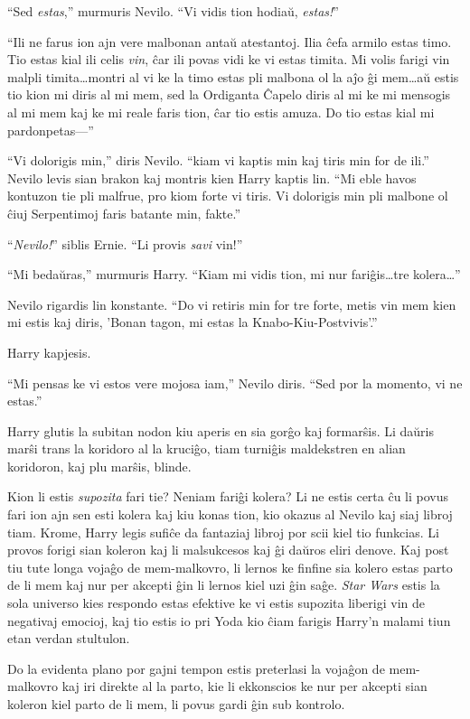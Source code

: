 ``Sed \emph{estas},'' murmuris Nevilo. ``Vi vidis tion hodiaŭ, \emph{estas!}''

``Ili ne farus ion ajn vere malbonan antaŭ atestantoj. Ilia ĉefa armilo estas
timo. Tio estas kial ili celis \emph{vin}, ĉar ili povas vidi ke vi estas
timita. Mi volis farigi vin malpli timita\ldots montri al vi ke la timo estas
pli malbona ol la aĵo ĝi mem\ldots aŭ estis tio kion mi diris al mi mem, sed la
Ordiganta Ĉapelo diris al mi ke mi mensogis al mi mem kaj ke mi reale faris
tion, ĉar tio estis amuza. Do tio estas kial mi pardonpetas—''

``Vi dolorigis min,'' diris Nevilo. ``kiam vi kaptis min kaj
tiris min for de ili.'' Nevilo levis sian brakon kaj montris kien
Harry kaptis lin. ``Mi eble havos kontuzon tie pli malfrue, pro kiom
forte vi tiris. Vi dolorigis min pli malbone ol ĉiuj Serpentimoj
faris batante min, fakte.''

``\emph{Nevilo!}'' siblis Ernie. ``Li provis \emph{savi} vin!''

``Mi bedaŭras,'' murmuris Harry. ``Kiam mi vidis tion, mi nur fariĝis\ldots tre
kolera\ldots''

Nevilo rigardis lin konstante. ``Do vi retiris min for tre forte, metis vin mem
kien mi estis kaj diris, 'Bonan tagon, mi estas la Knabo-Kiu-Postvivis'.''

Harry kapjesis.

``Mi pensas ke vi estos vere mojosa iam,'' Nevilo diris. ``Sed por la momento,
vi ne estas.''

Harry glutis la subitan nodon kiu aperis en sia gorĝo kaj formarŝis. Li daŭris
marŝi trans la koridoro al la kruciĝo, tiam turniĝis maldekstren en alian
koridoron, kaj plu marŝis, blinde.

Kion li estis \emph{supozita} fari tie? Neniam fariĝi kolera? Li ne estis certa
ĉu li povus fari ion ajn sen esti kolera kaj kiu konas tion, kio okazus al
Nevilo kaj siaj libroj tiam. Krome, Harry legis sufiĉe da fantaziaj libroj por
scii kiel tio funkcias. Li provos forigi sian koleron kaj li malsukcesos kaj ĝi
daŭros eliri denove. Kaj post tiu tute longa vojaĝo de mem-malkovro, li lernos
ke finfine sia kolero estas parto de li mem kaj nur per akcepti ĝin li lernos
kiel uzi ĝin saĝe. \emph{Star Wars} estis la sola universo kies respondo estas
efektive ke vi estis supozita liberigi vin de negativaj emocioj, kaj tio estis
io pri Yoda kio ĉiam farigis Harry'n malami tiun etan verdan stultulon.

Do la evidenta plano por gajni tempon estis preterlasi la vojaĝon de
mem-malkovro kaj iri direkte al la parto, kie li ekkonscios ke nur per akcepti
sian koleron kiel parto de li mem, li povus gardi ĝin sub kontrolo.

